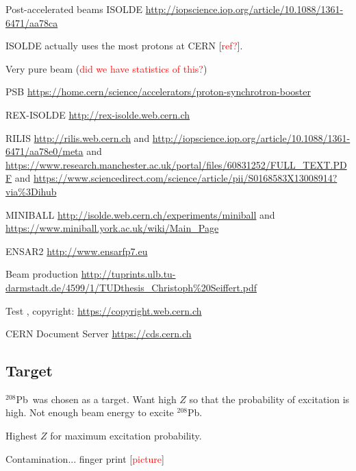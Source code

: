 \documentclass[twoside,english]{uiofysmaster/uiofysmaster}
\newcommand{\Pb}{$^{208}$Pb}
\begin{document}
\bigskip

Post-accelerated beams ISOLDE \url{http://iopscience.iop.org/article/10.1088/1361-6471/aa78ca}

\bigskip

ISOLDE actually uses the most protons at CERN [\textcolor{red}{ref?}].

\bigskip

Very pure beam (\textcolor{red}{did we have statistics of this?})

\bigskip

PSB \url{https://home.cern/science/accelerators/proton-synchrotron-booster}

\bigskip

REX-ISOLDE \url{http://rex-isolde.web.cern.ch}

\bigskip

RILIS \url{http://rilis.web.cern.ch} and \url{http://iopscience.iop.org/article/10.1088/1361-6471/aa78e0/meta} and \url{https://www.research.manchester.ac.uk/portal/files/60831252/FULL_TEXT.PDF} and \url{https://www.sciencedirect.com/science/article/pii/S0168583X13008914?via%3Dihub}

\bigskip

MINIBALL \url{http://isolde.web.cern.ch/experiments/miniball} and \url{https://www.miniball.york.ac.uk/wiki/Main_Page}

\bigskip

ENSAR2 \url{http://www.ensarfp7.eu}

\bigskip

Beam production \url{http://tuprints.ulb.tu-darmstadt.de/4599/1/TUDthesis_Christoph%20Seiffert.pdf}

\bigskip

Test \cite{CERN-AC}, copyright: \url{https://copyright.web.cern.ch}

\bigskip

CERN Document Server  \url{https://cds.cern.ch}


\subsection{Target}

\Pb\ was chosen as a target. Want high $Z$ so that the probability of excitation is high. Not enough beam energy to excite \Pb. \newline

Highest $Z$ for maximum excitation probability.


Contamination... finger print [\textcolor{red}{picture}]
\end{document}
